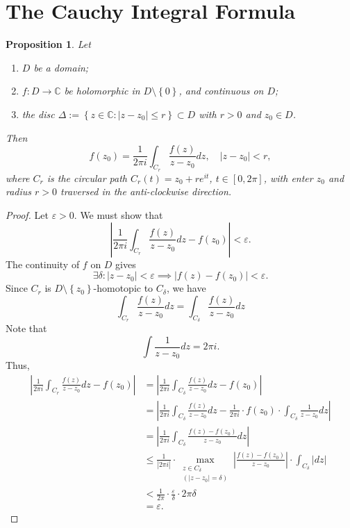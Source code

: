 \documentclass[12pt,openany]{book}
\newtheorem{proposition}[theorem]{Proposition}
\theoremstyle{definition}
\newcommand{\set}[1]{\left\{#1\right\}}
\newcommand{\C}{\mathbb{C}}
\newcommand{\of}[1]{\left( #1 \right)}
\newcommand{\abs}[1]{\left\lvert #1 \right\rvert}
\begin{document}
	\section{The Cauchy Integral Formula}
	\begin{tcolorbox}[colback=white,colframe=procolor,arc=5pt,title={\color{white}\bf }]
		\begin{proposition}
			Let \begin{enumerate}[(1)]
				\item $D$ be a domain;
				\item $f:D\to\C$ be holomorphic in $D\setminus\set{0}$, and continuous on $D$;
				\item the disc $\Delta:=\set{z\in\C:\abs{z-z_0}\leq r}\subset D$ with $r>0$ and $z_0\in D$.
			\end{enumerate} Then \[
			f\of{z_0}=\frac{1}{2\pi i}\int_{C_r}\frac{f\of{z}}{z-z_0}dz,\quad \abs{z-z_0}<r,
			\] where $C_r$ is the circular path $C_r\of{t}=z_0+re^{it}$, $t\in[0,2\pi]$, with enter $z_0$ and radius $r>0$ traversed in the anti-clockwise direction.
		\end{proposition}
	\end{tcolorbox}
	\begin{proof}
		Let $\varepsilon>0$. We must show that \[
		\abs{\frac{1}{2\pi i}\int_{C_r}\frac{f\of{z}}{z-z_0}dz-f\of{z_0}}<\varepsilon.
		\] The continuity of $f$ on $D$ gives \[
		\exists\delta:\abs{z-z_0}<\varepsilon\implies\abs{f\of{z}-f\of{z_0}}<\varepsilon.
		\] Since $C_r$ is $D\setminus\set{z_0}$-homotopic to $C_\delta$, we have \[
		\int_{C_r}\frac{f\of{z}}{z-z_0}dz=\int_{C_\delta}\frac{f\of{z}}{z-z_0}dz
		\] Note that \[
		\int\frac{1}{z-z_0}dz=2\pi i.
		\] Thus, \begin{align*}
			\abs{\frac{1}{2\pi i}\int_{C_r}\frac{f\of{z}}{z-z_0}dz-f\of{z_0}}&=
			\abs{\frac{1}{2\pi i}\int_{C_\delta}\frac{f\of{z}}{z-z_0}dz-f\of{z_0}}\\
			&=\abs{\frac{1}{2\pi i}\int_{C_\delta}\frac{f\of{z}}{z-z_0}dz-\frac{1}{2\pi i}\cdot f\of{z_0}\cdot\int_{C_\delta}\frac{1}{z-z_0}dz}\\
			&=\abs{\frac{1}{2\pi i}\int_{C_\delta}\frac{f\of{z}-f\of{z_0}}{z-z_0}dz}\\
			&\leq\frac{1}{\abs{2\pi i}}\cdot\max_{\substack{z\in C_\delta\\ (\abs{z-z_0}=\delta)}}\abs{\frac{f\of{z}-f\of{z_0}}{z-z_0}}\cdot\int_{C_\delta}\abs{dz}\\
			&<\frac{1}{2\pi}\cdot\frac{\varepsilon}{\delta}\cdot 2\pi\delta\\
			&=\varepsilon.
		\end{align*}
	\end{proof}
	
\end{document}
